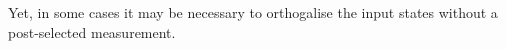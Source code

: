 \documentclass[aps,prl,twocolumn, superscriptaddress]{revtex4-1}
\begin{document}
Yet, in some cases it may be necessary to orthogalise the input states without a post-selected measurement.
\end{document}
